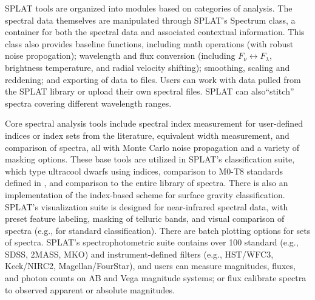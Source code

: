 \documentclass[usenatbib]{basi}
\begin{document}
SPLAT tools are organized into modules based on categories of analysis. The spectral data themselves are manipulated through SPLAT's Spectrum class, a container for both the spectral data and associated contextual information. This class also provides baseline functions, including math operations (with robust noise propogation); wavelength and flux conversion (including $F_{\nu} \leftrightarrow F_{\lambda}$, brightness temperature, and radial velocity shifting); smoothing, scaling and reddening; and exporting of data to files. Users can work with data pulled from the SPLAT library or upload their own spectral files.  SPLAT can also``stitch'' spectra covering different wavelength ranges.

Core spectral analysis tools include spectral index measurement for user-defined indices or index sets from the literature, equivalent width measurement, and comparison of spectra, all with Monte Carlo noise propagation and a variety of masking options. These base tools are utilized in SPLAT's classification suite, which type ultracool dwarfs using indices, comparison to M0-T8 standards defined in \citet{2010ApJS..190..100K}, and comparison to the entire library of spectra.  There is also an implementation of the \citet{2013ApJ...772...79A} index-based scheme for surface gravity classification.
SPLAT's visualization suite is designed for near-infrared spectral data, with preset feature labeling, masking of telluric bands, and visual comparison of spectra (e.g., for standard classification). There are batch plotting options for sets of spectra.
SPLAT's spectrophotometric suite contains over 100 standard (e.g., SDSS, 2MASS, MKO) and instrument-defined filters (e.g., HST/WFC3, Keck/NIRC2, Magellan/FourStar), and users can measure magnitudes, fluxes, and photon counts on AB and Vega magnitude systems; or flux calibrate spectra to observed apparent or absolute magnitudes.
\end{document}
